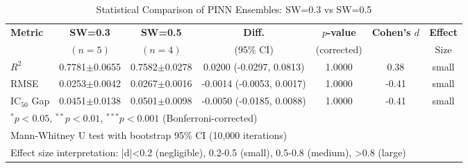 
\begin{table}[htbp]
\centering
\caption{Statistical Comparison of PINN Ensembles: SW=0.3 vs SW=0.5}
\label{tab:ensemble_comparison}
\begin{tabular}{lcccccc}
\hline
\textbf{Metric} & \textbf{SW=0.3} & \textbf{SW=0.5} & \textbf{Diff.} & \textbf{$p$-value} & \textbf{Cohen's $d$} & \textbf{Effect} \\
                & $(n=5)$         & $(n=4)$         & (95\% CI)      & (corrected)        &                     & Size \\
\hline
$R^2$ & 0.7781$\pm$0.0655 & 0.7582$\pm$0.0278 & 0.0200 (-0.0297, 0.0813) & 1.0000 & 0.38 & small \\
RMSE & 0.0253$\pm$0.0042 & 0.0267$\pm$0.0016 & -0.0014 (-0.0053, 0.0017) & 1.0000 & -0.41 & small \\
IC$_{50}$ Gap & 0.0451$\pm$0.0138 & 0.0501$\pm$0.0098 & -0.0050 (-0.0185, 0.0088) & 1.0000 & -0.41 & small \\
\hline
\multicolumn{7}{l}{\small $^*p<0.05$, $^{**}p<0.01$, $^{***}p<0.001$ (Bonferroni-corrected)} \\
\multicolumn{7}{l}{\small Mann-Whitney U test with bootstrap 95\% CI (10,000 iterations)} \\
\multicolumn{7}{l}{\small Effect size interpretation: |d|<0.2 (negligible), 0.2-0.5 (small), 0.5-0.8 (medium), >0.8 (large)} \\
\end{tabular}
\end{table}
